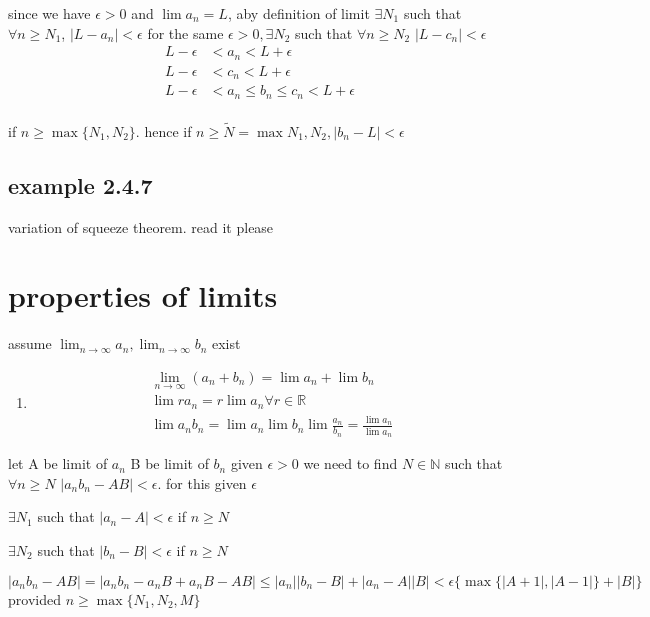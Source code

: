 \documentclass[letterpaper]{article}
\begin{document}
since we have $\epsilon>0$ and $\lim a_n=L$, aby definition of limit $\exists N_1$ such that $\forall n\ge N_1$, $\left\lvert L-a_n\right\rvert<\epsilon$ for the same $\epsilon>0, \exists N_2$ such that $\forall n\ge N_2$ $\left\lvert L-c_n\right\rvert<\epsilon$
\begin{align*}
  L-\epsilon&< a_n<L+\epsilon\\
  L-\epsilon&< c_n<L+\epsilon\\
  L-\epsilon&< a_n\le b_n\le c_n<L+\epsilon\\
\end{align*}

if $n\ge\max\{N_1,N_2\}$. hence if $n\ge\tilde N=\max{N_1,N_2}, \left\lvert b_n-L\right\rvert<\epsilon$

\subsection*{example 2.4.7}
variation of squeeze theorem. read it please

\section*{properties of limits}
assume $\lim_{n\to\infty}a_n,\lim_{n\to\infty}b_n$ exist
\begin{enumerate}
\item
\begin{align*}
  \lim_{n\to\infty}(a_n+b_n)=\lim a_n+\lim b_n\\
  \lim ra_n=r\lim a_n\forall r\in\mathbb{R}\\
  \lim a_nb_n=\lim a_n \lim b_n
  \lim \frac{a_n}{b_n}=\frac{\lim a_n}{\lim a_n}
\end{align*}

\end{enumerate}
let A be limit of $a_n$ B be limit of $b_n$ given $\epsilon>0$ we need to find $N\in \mathbb{N}$ such that $\forall n\ge N$ $\left\lvert a_nb_n-AB\right\rvert<\epsilon$. for this given $\epsilon$

$\exists N_1$ such that $\left\lvert a_n-A\right\rvert<\epsilon$ if $n\ge N$

$\exists N_2$ such that $\left\lvert b_n-B\right\rvert<\epsilon$ if $n\ge N$

$\left\lvert a_nb_n-AB\right\rvert=\left\lvert a_nb_n-a_nB+a_nB-AB\right\rvert\le|a_n||b_n-B|+|a_n-A||B|<\epsilon\{\max\{|A+1|,|A-1|\}+|B|\}$ provided $n\ge\max\{N_1,N_2,M\}$
\end{document}
